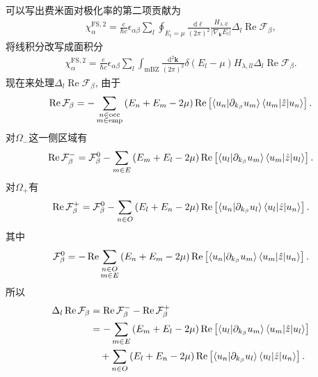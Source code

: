 \documentclass[10pt, oneside]{article}
\begin{document}
可以写出费米面对极化率的第二项贡献为
\begin{align}
	\chi^{\mathrm{FS},2}_{\alpha} =  \frac{e }{\hbar c} \epsilon_{\alpha \beta} \sum_{l} \oint_{E_{l} = \mu} \frac{\mathrm{d} \ell}{ \left(2 \pi\right)^2} \frac{ H_{\lambda,ll}}{\left|\nabla_{\bm{k}} E_{l }\right|} \Delta_{l } \operatorname{Re} \mathcal{F}_{\beta},
\end{align}
将线积分改写成面积分
\begin{align}
	\chi^{\mathrm{FS},2}_{\alpha} =  \frac{e }{\hbar c} \epsilon_{\alpha \beta} \sum_{l} \int_{\mathrm{mBZ}} \frac{\mathrm{d}^{2} \bm{k}}{\left(2 \pi\right)^2} \delta \left(E_{l} - \mu\right) H_{\lambda,ll} \Delta_{l} \operatorname{Re} \mathcal{F}_{\beta}.
\end{align}
现在来处理\(\Delta_{l} \operatorname{Re} \mathcal{F}_{\beta}\), 由于
\begin{align}
	\operatorname{Re} \mathcal{F}_{\beta} = -\sum_{\substack{n \in \mathrm{occ} \\ m \in \mathrm{emp}}} \left(E_{n } + E_{m } - 2\mu\right) \operatorname{Re} \left[\braket{u_{n } | \partial_{k_{\beta}} u_{m }} \braket{u_{m } | \hat{z} | u_{n }}\right].
\end{align}
对\(\Omega_{-}\)这一侧区域有
\begin{align}
	\operatorname{Re} \mathcal{F}^{-}_{\beta} = \mathcal{F}_{\beta}^{0} - \sum_{m \in E} \left(E_{m} + E_{l} - 2\mu\right) \operatorname{Re} \left[\braket{u_{l} | \partial_{k_{\beta}} u_{m }} \braket{u_{m } | \hat{z} | u_{l}}\right].
\end{align}
对\(\Omega_{+}\)有
\begin{align}
	\operatorname{Re} \mathcal{F}^{+}_{\beta} = \mathcal{F}_{\beta}^{0} - \sum_{n \in O} \left(E_{l} + E_{n} - 2\mu\right) \operatorname{Re} \left[\braket{u_{n} | \partial_{k_{\beta}} u_{l}} \braket{u_{l } | \hat{z} | u_{n }}\right].
\end{align}
其中
\begin{align}
	\mathcal{F}_{\beta}^{0} = - \operatorname{Re} \sum_{\substack{n \in O \\ m \in E}} \left(E_{n } + E_{m } - 2 \mu\right) \operatorname{Re} \left[\braket{u_{n } | \partial_{k_{\beta}} u_{m }} \braket{u_{m } | \hat{z} | u_{n }}\right].
\end{align}
所以
\begin{align}
	\begin{split}
			\Delta_{l} \operatorname{Re} \mathcal{F}_{\beta} &= \operatorname{Re} \mathcal{F}^{-}_{\beta} - \operatorname{Re} \mathcal{F}^{+}_{\beta}	 \\
			& = - \sum_{m \in E} \left(E_{m} + E_{l} - 2\mu\right) \operatorname{Re} \left[\braket{u_{l} | \partial_{k_{\beta}} u_{m }} \braket{u_{m } | \hat{z} | u_{l}}\right] \\
			& \quad + \sum_{n \in O} \left(E_{l} + E_{n} - 2\mu\right) \operatorname{Re} \left[\braket{u_{n} | \partial_{k_{\beta}} u_{l}} \braket{u_{l } | \hat{z} | u_{n }}\right] .
	\end{split}
\end{align}
\end{document}
